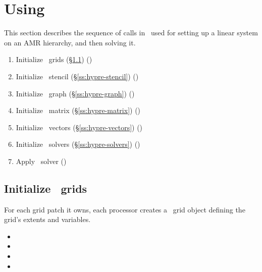 \documentclass[10pt]{article}
\begin{document}
\section{Using \hypre}

This section describes the sequence of calls in \hypre\ used for
setting up a linear system on an AMR hierarchy, and then solving it.

\begin{enumerate}
\item Initialize \hypre\ grids (\S\ref{ss:hypre-grids}) ()
\item Initialize \hypre\ stencil (\S\ref{ss:hypre-stencil}) ()
\item Initialize \hypre\ graph (\S\ref{ss:hypre-graph}) ()
\item Initialize \hypre\ matrix (\S\ref{ss:hypre-matrix}) ()
\item Initialize \hypre\ vectors (\S\ref{ss:hypre-vectors}) ()
\item Initialize \hypre\ solvers (\S\ref{ss:hypre-solvers}) ()
\item Apply \hypre\ solver ()
\end{enumerate}

\subsection{Initialize \hypre\ grids} \label{ss:hypre-grids}

For each grid patch it owns, each processor creates a \hypre\ grid
object defining the grid's extents and variables.  

\begin{itemize}
\item {}
\item {}
\item {}
\item {}
\end{itemize}
\end{document}
